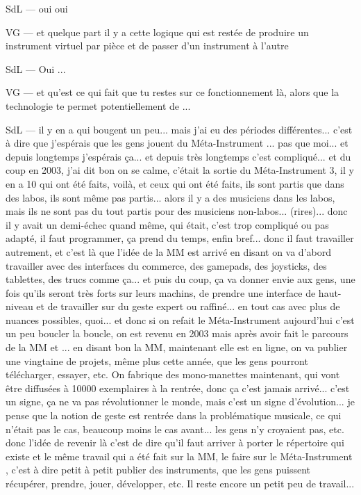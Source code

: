 SdL — oui oui 

VG — et quelque part il y a cette logique qui est restée de produire un instrument virtuel par pièce et de passer d'un instrument à l'autre 

SdL — Oui ... 

VG — et qu'est ce qui fait que tu restes sur ce fonctionnement là, alors que la technologie te permet potentiellement de ... 

SdL — il y en a qui bougent un peu... mais j'ai eu des périodes différentes... c'est à dire que j'espérais que les gens jouent du Méta-Instrument ... pas que moi... et depuis longtemps j'espérais ça... et depuis très longtemps c'est compliqué... et du coup en 2003, j'ai dit bon on se calme, c'était la sortie du Méta-Instrument 3, il y en a 10 qui ont été faits, voilà, et ceux qui ont été faits, ils sont partis que dans des labos, ils sont même pas partis... alors il y a des musiciens dans les labos, mais ils ne sont pas du tout partis pour des musiciens non-labos... (rires)... donc il y avait un demi-échec quand même, qui était, c'est trop compliqué ou pas adapté, il faut programmer, ça prend du temps, enfin bref... donc il faut travailler autrement, et c'est là que l'idée de la MM est arrivé en disant on va d'abord travailler avec des interfaces du commerce, des gamepads, des joysticks, des tablettes, des trucs comme ça... et puis du coup, ça va donner envie aux gens, une fois qu'ils seront très forts sur leurs machins, de prendre une interface de haut-niveau et de travailler sur du geste expert ou raffiné... en tout cas avec plus de nuances possibles, quoi... et donc si on refait le Méta-Instrument aujourd'hui c'est un peu boucler la boucle, on est revenu en 2003 mais après avoir fait le parcours de la MM et ... en disant bon la MM, maintenant elle est en ligne, on va publier une vingtaine de projets, même plus cette année, que les gens pourront télécharger, essayer, etc. On fabrique des mono-manettes maintenant, qui vont être diffusées à 10000 exemplaires à la rentrée, donc ça c'est jamais arrivé... c'est un signe, ça ne va pas révolutionner le monde, mais c'est un signe d'évolution... je pense que la notion de geste est rentrée dans la problématique musicale, ce qui n'était pas le cas, beaucoup moins le cas avant... les gens n'y croyaient pas, etc. donc l'idée de revenir là c'est de dire qu'il faut arriver à porter le répertoire qui existe et le même travail qui a été fait sur la MM, le faire sur le Méta-Instrument , c'est à dire petit à petit publier des instruments, que les gens puissent récupérer, prendre, jouer, développer, etc. Il reste encore un petit peu de travail... 

